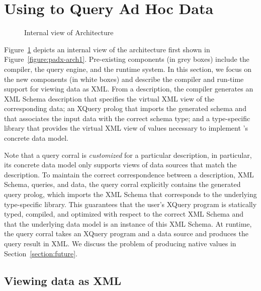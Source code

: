 \section{Using \padx{} to Query Ad Hoc Data}
\label{section:padx}

\begin{figure}
\begin{center}
\end{center}
\caption{Internal view of \padx{} Architecture}
\label{figure:padx-arch}
\end{figure}

Figure~\ref{figure:padx-arch} depicts an internal view of the \padx{}
architecture first shown in Figure~\ref{figure:padx-arch1}.
Pre-existing components (in grey boxes) include the \pads{} compiler,
the \Galax{} query engine, and the \pads{} runtime system.  In this
section, we focus on the new components (in white boxes) and describe
the compiler and run-time support for viewing \pads{} data as XML.
From a \pads{} description, the compiler generates an XML Schema
description that specifies the virtual XML view of the corresponding
\pads{} data; an XQuery prolog that imports the generated schema and
that associates the input data with the correct schema type; and a
type-specific library that provides the virtual XML view of \pads{}
values necessary to implement \padx{}'s concrete data model.  

Note that a query corral is \emph{customized} for a particular \pads{}
description, in particular, its concrete data model only supports
views of data sources that match the \pads{} description.  To maintain
the correct correspondence between a description, XML Schema, queries,
and data, the query corral explicitly contains the generated query
prolog, which imports the XML Schema that corresponds to the
underlying type-specific library.  This guarantees that the user's
XQuery program is statically typed, compiled, and optimized with
respect to the correct XML Schema and that the underlying data model
is an instance of this XML Schema.  At runtime, the query corral takes
an XQuery program and a \pads{} data source and produces the query
result in XML.  We discuss the problem of producing native \pads{}
values in Section~\ref{section:future}.

\subsection{Viewing \pads{} data as XML}	

